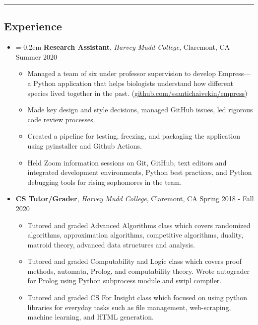 \documentclass[10pt,letterpaper]{article}
\begin{document}
\hrule
\vspace{-0.95em}
\subsection*{Experience}
  \begin{itemize}
    \item[]
    \parskip=-0.2em
    {\textbf{Research Assistant}, \textit{Harvey Mudd College}, Claremont, CA \hfill {Summer 2020}}
    \begin{itemize}[label=\textbullet]
      \itemsep0.1em
      \item Managed a team of six under professor supervision to develop Empress---a Python application that helps biologists understand how different species lived together in the past. (\href{https://github.com/ssantichaivekin/empress}{github.com/ssantichaivekin/empress})
      \item Made key design and style decisions, managed GitHub issues, led rigorous code review processes.
      \item Created a pipeline for testing, freezing, and packaging the application using pyinstaller and Github Actions.
      \item Held Zoom information sessions on Git, GitHub, text editors and integrated development environments, Python best practices, and Python debugging tools for rising sophomores in the team.
    \end{itemize}
    \vspace{0.1em}
    \item[]
    {\textbf{CS Tutor/Grader}, \textit{Harvey Mudd College}, Claremont, CA \hfill {Spring 2018 - Fall 2020}}
    \begin{itemize}[label=\textbullet]
      \itemsep0.1em
      \item Tutored and graded Advanced Algorithms class which covers randomized algorithms, approximation algorithms, competitive algorithms, duality, matroid theory, advanced data structures and analysis.
      \item Tutored and graded Computability and Logic class which covers proof methods, automata, Prolog, and computability theory. Wrote autograder for Prolog using Python subprocess module and swipl compiler.
      \item Tutored and graded CS For Insight class which focused 
      on using python libraries for everyday tasks such as file management, web-scraping, 
      machine learning, and HTML generation.
    \end{itemize}

\end{itemize}
\end{document}
